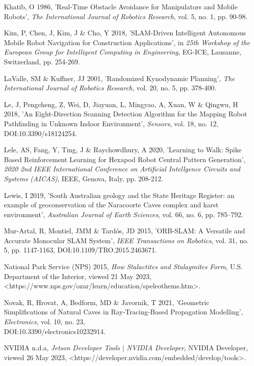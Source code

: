 Khatib, O 1986, 'Real-Time Obstacle Avoidance for Manipulators and Mobile Robots', \textit{The International Journal of Robotics Research}, vol. 5, no. 1, pp. 90-98.

Kim, P, Chen, J, Kim, J \& Cho, Y 2018, 'SLAM-Driven Intelligent Autonomous Mobile Robot Navigation for Construction Applications', in \textit{25th Workshop of the European Group for Intelligent Computing in Engineering}, EG-ICE, Lausanne, Switzerland, pp. 254-269.

LaValle, SM \& Kuffner, JJ 2001, 'Randomized Kynodynamic Planning', \textit{The International Journal of Robotics Research}, vol. 20, no. 5, pp. 378-400.

Le, J, Pengcheng, Z, Wei, D, Jiayuan, L, Mingyao, A, Xuan, W \& Qingwu, H 2018, 'An Eight-Direction Scanning Detection Algorithm for the Mapping Robot Pathfinding in Unknown Indoor Environment', \textit{Sensors}, vol. 18, no. 12, DOI:10.3390/s18124254.

Lele, AS, Fang, Y, Ting, J \& Raychowdhury, A 2020, 'Learning to Walk: Spike Based Reinforcement Learning for Hexapod Robot Central Pattern Generation', \textit{2020 2nd IEEE International Conference on Artificial Intellgence Circuits and Systems (AICAS)}, IEEE, Genova, Italy, pp. 208-212. 

Lewis, I 2019, ’South Australian geology and the State Heritage Register: an example of geoconservation of the Naracoorte Caves complex and karst environment’, \textit{Australian Journal of Earth Sciences}, vol. 66, no. 6, pp. 785–792.

Mur-Artal, R, Montiel, JMM \& Tardós, JD 2015, 'ORB-SLAM: A Versatile and Accurate Monocular SLAM System', \textit{IEEE Transactions on Robotics}, vol. 31, no. 5, pp. 1147-1163, DOI:10.1109/TRO.2015.2463671.

National Park Service (NPS) 2015, \textit{How Stalactites and Stalagmites Form}, U.S. Department of the Interior, viewed 21 May 2023, \\ \textless https://www.nps.gov/ozar/learn/education/speleothems.htm\textgreater.

Novak, R, Hrovat, A, Bedform, MD \& Javornik, T 2021, 'Geometric Simplifications of Natural Caves in Ray-Tracing-Based Propagation Modelling', \textit{Electronics}, vol. 10, no. 23, \\DOI:10.3390/electronics10232914.

NVIDIA n.d.a, \textit{Jetson Developer Tools $\mid$ NVIDIA Developer}, NVIDIA Developer, viewed 26 May 2023, \textless https://developer.nvidia.com/embedded/develop/tools\textgreater.


